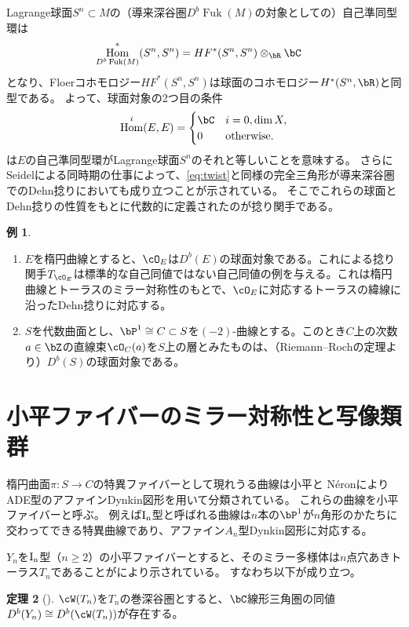 \documentclass[uplatex,a4paper,dvipdfmx]{jsarticle}
\numberwithin{equation}{section}
\theoremstyle{definition}
\newtheorem{theorem}{定理}[section]
\newtheorem{example}[theorem]{例}
\DeclareMathOperator{\Hom}{\mathrm{Hom}}
\DeclareMathOperator{\Fuk}{Fuk}
\begin{document}
Lagrange球面$S^n \subset M$の（導来深谷圏$D^b\Fuk(M)$の対象としての）自己準同型環は
\begin{align}
	\Hom_{D^b\Fuk(M)}^*(S^n, S^n) & = HF^*(S^n, S^n)\otimes_\bR \bC
\end{align}
となり、Floerコホモロジー$HF^*(S^n, S^n)$は球面のコホモロジー$H^*(S^n, \bR)$と同型である。
よって、球面対象の2つ目の条件$$\Hom^i(E, E) = \begin{cases}
		\bC & i = 0, \dim X,    \\
		0   & \text{otherwise.}
	\end{cases}$$は$E$の自己準同型環がLagrange球面$S^n$のそれと等しいことを意味する。
さらにSeidelによる同時期の仕事\cite{MR1978046}によって、\eqref{eq:twist}と同様の完全三角形が導来深谷圏でのDehn捻りにおいても成り立つことが示されている。
そこでこれらの球面とDehn捻りの性質をもとに代数的に定義されたのが捻り関手である。
\begin{example}
	\begin{enumerate}
		\item $E$を楕円曲線とすると、$\cO_E$は$D^b(E)$の球面対象である。これによる捻り関手$T_{\cO_E}$は標準的な自己同値ではない自己同値の例を与える。これは楕円曲線とトーラスのミラー対称性のもとで、$\cO_E$に対応するトーラスの緯線に沿ったDehn捻りに対応する。
		\item $S$を代数曲面とし、$\bP^1 \cong C \subset S$を$(-2)$-曲線とする。このとき$C$上の次数$a \in \bZ$の直線束$\cO_C(a)$を$S$上の層とみたものは、（Riemann--Rochの定理より）$D^b(S)$の球面対象である。
	\end{enumerate}
\end{example}
\section{小平ファイバーのミラー対称性と写像類群}
楕円曲面$\pi \colon S \to C$の特異ファイバーとして現れうる曲線は小平と N\'{e}ronによりADE型のアファインDynkin図形を用いて分類されている。
これらの曲線を小平ファイバーと呼ぶ。
例えば$\rm{I}_n$型と呼ばれる曲線は$n$本の$\bP^1$が$n$角形のかたちに交わってできる特異曲線であり、アファイン$A_n$型Dynkin図形に対応する。



$Y_n$を$\rm{I}_n$型（$n \geq 2$）の小平ファイバーとすると、そのミラー多様体は$n$点穴あきトーラス$T_n$であることが\cite{MR3663596}により示されている。
すなわち以下が成り立つ。
\begin{theorem}[\cite{MR3663596}]
	$\cW(T_n)$を$T_n$の巻深谷圏とすると、$\bC$線形三角圏の同値$D^b(Y_n) \cong D^b(\cW(T_n))$が存在する。
\end{theorem}
\end{document}

